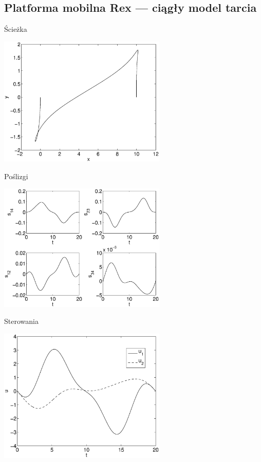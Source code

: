 \documentclass{beamer}
\begin{document}
\subsection{Platforma mobilna Rex --- ciągły model tarcia}
\begin{frame}{Ścieżka}
\begin{center}
\includegraphics[width=0.6\textwidth]{img/final_15_1_20_path.eps}
\end{center}
\end{frame}
\begin{frame}{Poślizgi}
\begin{center}
\includegraphics[width=0.6\textwidth]{img/final_15_1_20_slips.eps}
\end{center}
\end{frame}
\begin{frame}{Sterowania}
\begin{center}
\includegraphics[width=0.6\textwidth]{img/final_15_1_20_u.eps}
\end{center}
\end{frame}
\end{document}
